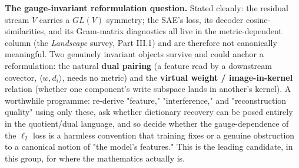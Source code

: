 \textbf{The gauge-invariant reformulation question.} Stated cleanly: the residual stream $V$ carries a $GL(V)$ symmetry; the SAE's loss, its decoder cosine-similarities, and its Gram-matrix diagnostics all live in the metric-dependent column (the \emph{Landscape} survey, Part III.1) and are therefore not canonically meaningful. Two genuinely invariant objects survive and could anchor a reformulation: the natural \textbf{dual pairing} (a feature read by a downstream covector, $\langle w, d_i\rangle$, needs no metric) and the \textbf{virtual weight / image-in-kernel} relation (whether one component's write subspace lands in another's kernel). A worthwhile programme: re-derive "feature," "interference," and "reconstruction quality" using only these, ask whether dictionary recovery can be posed entirely in the quotient/dual language, and so decide whether the gauge-dependence of the $\ell_2$ loss is a harmless convention that training fixes or a genuine obstruction to a canonical notion of "the model's features." This is the leading candidate, in this group, for where the mathematics actually is.


\printbibliography

